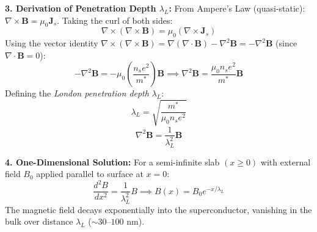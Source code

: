 \begin{theorysol}
\textbf{3. Derivation of Penetration Depth $\lambda_L$:}
From Ampere's Law (quasi-static): $\nabla \times \mathbf{B} = \mu_0 \mathbf{J}_s$.
Taking the curl of both sides:
\begin{equation}
\nabla \times (\nabla \times \mathbf{B}) = \mu_0 (\nabla \times \mathbf{J}_s)
\end{equation}
Using the vector identity $\nabla \times (\nabla \times \mathbf{B}) = \nabla(\nabla \cdot \mathbf{B}) - \nabla^2 \mathbf{B} = -\nabla^2 \mathbf{B}$ (since $\nabla \cdot \mathbf{B} = 0$):
\begin{equation}
-\nabla^2 \mathbf{B} = -\mu_0 \left(\frac{n_s e^2}{m^*}\right)\mathbf{B} \implies \nabla^2 \mathbf{B} = \frac{\mu_0 n_s e^2}{m^*} \mathbf{B}
\end{equation}
Defining the \textit{London penetration depth} $\lambda_L$:
\begin{equation}
\lambda_L = \sqrt{\frac{m^*}{\mu_0 n_s e^2}}
\end{equation}
\begin{equation}
\nabla^2 \mathbf{B} = \frac{1}{\lambda_L^2} \mathbf{B}
\end{equation}

\textbf{4. One-Dimensional Solution:}
For a semi-infinite slab $(x \ge 0)$ with external field $B_0$ applied parallel to surface at $x=0$:
\begin{equation}
\frac{d^2 B}{dx^2} = \frac{1}{\lambda_L^2} B \implies B(x) = B_0 e^{-x/\lambda_L}
\end{equation}
The magnetic field decays exponentially into the superconductor, vanishing in the bulk over distance $\lambda_L$ ($\sim 30\text{--}100\text{ nm}$).
\end{theorysol}
\vspace{4mm}

